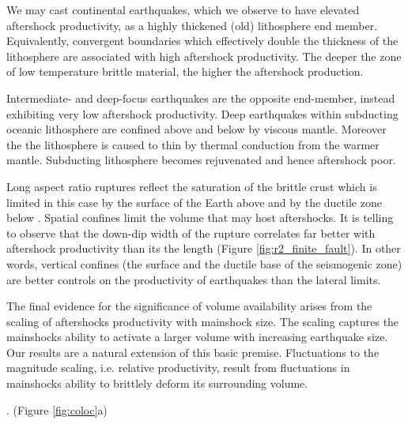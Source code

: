 \documentclass[draft, jgrga]{agujournal2018}
\begin{document}
We may cast continental earthquakes, which we observe to have elevated aftershock productivity, as a highly thickened (old) lithosphere end member. Equivalently, convergent boundaries which effectively double the thickness of the lithosphere are associated with high aftershock productivity. The deeper the zone of low temperature brittle material, the higher the aftershock production.

Intermediate- and deep-focus earthquakes are the opposite end-member, instead exhibiting very low aftershock productivity. Deep earthquakes within subducting oceanic lithosphere are confined above and below by viscous mantle. Moreover the the lithosphere is caused to thin by thermal conduction from the warmer mantle. Subducting lithosphere becomes rejuvenated and hence aftershock poor.

Long aspect ratio ruptures reflect the saturation of the brittle crust which is limited in this case by the surface of the Earth above and by the ductile zone below \citep{Scholz2019}. Spatial confines limit the volume that may host aftershocks. It is telling to observe that the down-dip width of the rupture correlates far better with aftershock productivity than its the length (Figure \ref{fig:r2_finite_fault}). In other words, vertical confines (the surface and the ductile base of the seismogenic zone) are better controls on the productivity of earthquakes than the lateral limits.

The final evidence for the significance of volume availability arises from the scaling of aftershocks productivity with mainshock size. The scaling captures the mainshocks ability to activate a larger volume with increasing earthquake size. Our results are a natural extension of this basic premise. Fluctuations to the magnitude scaling, i.e. relative productivity, result from fluctuations in mainshocks ability to brittlely deform its surrounding volume.

 \citep{Ben-Zion2006AnalysisRheology, Zaliapin2016AClusters}. (Figure \ref{fig:coloc}a)  %
\end{document}
